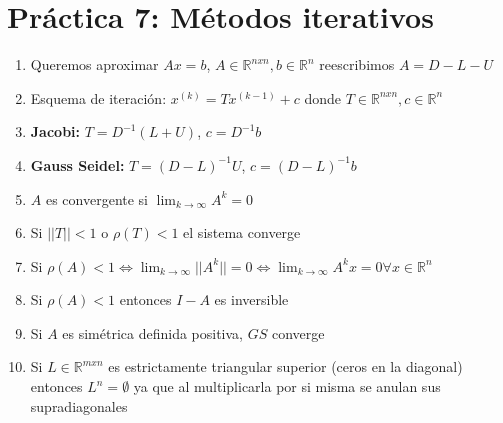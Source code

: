 \documentclass[10pt]{article}
\begin{document}
\section*{Práctica 7: Métodos iterativos}
\begin{enumerate}
    \item Queremos aproximar $Ax=b$, $A\in \mathbb{R}^{nxn}, b\in\mathbb{R}^n$ reescribimos $A = D - L - U$
    \item Esquema de iteración: $x^{(k)} = Tx^{(k-1)} + c$ donde $T\in \mathbb{R}^{nxn}, c\in\mathbb{R}^n$
    \item \textbf{Jacobi:} $T = D^{-1}(L+U)$, $c = D^{-1}b$
    \item \textbf{Gauss Seidel:} $T = (D-L)^{-1}U$, $c = (D-L)^{-1}b$
    \item $A$ es convergente si $\lim_{k \to \infty} A^k = 0$
    \item Si $||T|| < 1$ o $\rho(T) < 1$ el sistema converge
    \item Si $\rho(A) < 1 \iff \lim_{k \to \infty} ||A^k|| = 0 \iff \lim_{k \to \infty} A^kx = 0 \forall x \in \mathbb{R}^n$
    \item Si $\rho(A) < 1$ entonces $I-A$ es inversible
    \item Si $A$ es simétrica definida positiva, $GS$ converge

    \item Si $L \in \mathbb{R}^{mxn}$ es estrictamente triangular superior (ceros en la diagonal) entonces $L^n = \emptyset$ ya que al multiplicarla por si misma se anulan sus supradiagonales
\end{enumerate}
\end{document}

